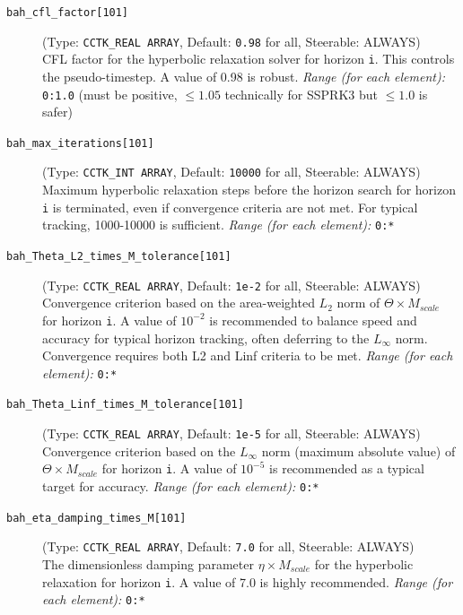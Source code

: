 \documentclass[a4paper,11pt]{article}
\begin{document}
\begin{description}
    \item[\texttt{bah\_cfl\_factor[101]}] (Type: \texttt{CCTK\_REAL ARRAY}, Default: \texttt{0.98} for all, Steerable: ALWAYS) \\
        CFL factor for the hyperbolic relaxation solver for horizon \texttt{i}. This controls the pseudo-timestep. A value of 0.98 is robust.
        \textit{Range (for each element):} \texttt{0:1.0} (must be positive, $\le 1.05$ technically for SSPRK3 but $\le 1.0$ is safer)

    \item[\texttt{bah\_max\_iterations[101]}] (Type: \texttt{CCTK\_INT ARRAY}, Default: \texttt{10000} for all, Steerable: ALWAYS) \\
        Maximum hyperbolic relaxation steps before the horizon search for horizon \texttt{i} is terminated, even if convergence criteria are not met. For typical tracking, 1000-10000 is sufficient.
        \textit{Range (for each element):} \texttt{0:*}

    \item[\texttt{bah\_Theta\_L2\_times\_M\_tolerance[101]}]
    (Type: \texttt{CCTK\_REAL ARRAY}, Default: \texttt{1e-2} for all, Steerable: ALWAYS) \\
        Convergence criterion based on the area-weighted $L_2$ norm of $\Theta \times M_{scale}$ for horizon \texttt{i}. A value of $10^{-2}$ is recommended to balance speed and accuracy for typical horizon tracking, often deferring to the $L_{\infty}$ norm. Convergence requires both L2 and Linf criteria to be met.
        \textit{Range (for each element):} \texttt{0:*}

    \item[\texttt{bah\_Theta\_Linf\_times\_M\_tolerance[101]}] (Type: \texttt{CCTK\_REAL ARRAY}, Default: \texttt{1e-5} for all, Steerable: ALWAYS) \\
        Convergence criterion based on the $L_{\infty}$ norm (maximum absolute value) of $\Theta \times M_{scale}$ for horizon \texttt{i}. A value of $10^{-5}$ is recommended as a typical target for accuracy.
        \textit{Range (for each element):} \texttt{0:*}

    \item[\texttt{bah\_eta\_damping\_times\_M[101]}] (Type: \texttt{CCTK\_REAL ARRAY}, Default: \texttt{7.0} for all, Steerable: ALWAYS) \\
        The dimensionless damping parameter $\eta \times M_{scale}$ for the hyperbolic relaxation for horizon \texttt{i}. A value of 7.0 is highly recommended.
        \textit{Range (for each element):} \texttt{0:*}


\end{description}
\end{document}
